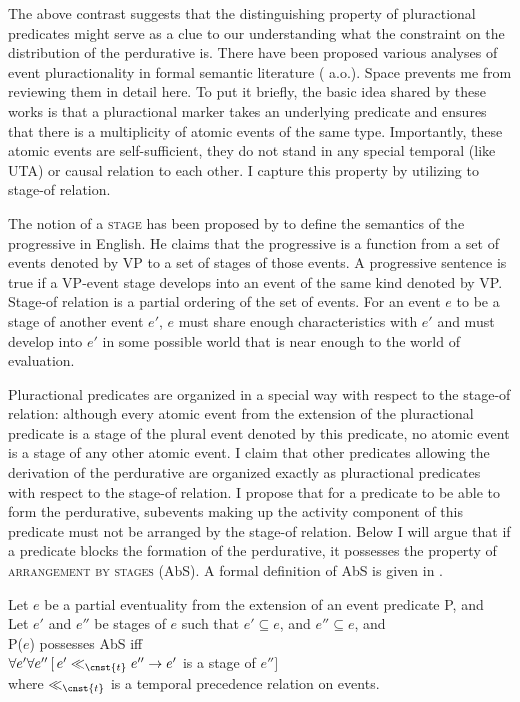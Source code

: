 \documentclass[output=paper,
]{langscibook}
\begin{document}
\noindent The above contrast suggests that the distinguishing property of pluractional predicates might serve as a clue to our understanding what the constraint on the distribution of the perdurative is. There have been proposed various analyses of event pluractionality in formal semantic literature (\citealt{lasersohn1995plurality,van2004adverbials,tovena2010pluractionality,henderson2012ways} a.o.). Space prevents me from reviewing them in detail here. To put it briefly, the basic idea shared by these works is that a pluractional marker takes an underlying predicate and ensures that there is a multiplicity of atomic events of the same type. Importantly, these atomic events are self-sufficient, they do not stand in any special temporal (like UTA) or causal relation to each other. I capture this property by utilizing to  stage-of relation. 

The notion of a \textsc{stage} has been proposed by \citet{landman1992progressive} to define the semantics of the progressive in English. He claims that the progressive is a function from a set of events denoted by VP to a set of stages of those events. A progressive sentence is true if a VP-event stage develops into an event of the same kind denoted by VP. Stage-of relation is a partial ordering of the set of events. For an event $e$ to be a stage of another event $e′$, $e$ must share enough characteristics with $e′$ and must develop into $e′$ in some possible world that is near enough to the world of evaluation. 

Pluractional predicates are organized in a special way with respect to the stage-of relation: although every atomic event from the extension of the pluractional predicate is a stage of the plural event denoted by this predicate, no atomic event is a stage of any other atomic event. I claim that other predicates allowing the derivation of the perdurative are organized exactly as pluractional predicates with respect to the stage-of relation. I propose that for a predicate to be able to form the perdurative, subevents making up the activity component of this predicate must not be arranged by the stage-of relation. Below I will argue that if a predicate blocks the formation of the perdurative, it possesses the property of \textsc{arrangement by stages} (AbS). A formal definition of AbS is given in .

\ea \label{ex:naumov:34}
Let $e$ be a partial eventuality from the extension of an event predicate P, and \\
Let $e'$ and $e''$ be stages of $e$ such that
\ea $e' \subseteq e$, and
\ex $e'' \subseteq e$, and\smallskip\\
P($e$) possesses AbS iff \\
$\forall e' \forall e''\,[\,e' \ll_{\cnst{t}} e'' \rightarrow e'$ is a stage of $e'']$\smallskip\\
where $\ll_{\cnst{t}}$ is a temporal precedence relation on events.
\z \z
\end{document}
